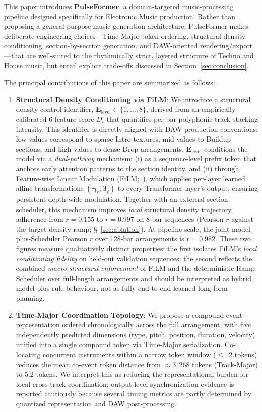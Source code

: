 \documentclass[pdflatex,sn-mathphys-num,twocolumn]{sn-jnl}
\theoremstyle{thmstyleone}
\theoremstyle{thmstyletwo}
\begin{document}
This paper introduces \textbf{PulseFormer}, a domain-targeted music-processing pipeline designed specifically for Electronic Music production. Rather than proposing a general-purpose music generation architecture, PulseFormer makes deliberate engineering choices---Time-Major token ordering, structural-density conditioning, section-by-section generation, and DAW-oriented rendering/export---that are well-suited to the rhythmically strict, layered structure of Techno and House music, but entail explicit trade-offs discussed in Section~\ref{sec:conclusion}. 

The principal contributions of this paper are summarized as follows:
\begin{enumerate}
    \item \textbf{Structural Density Conditioning via FiLM}: We introduce a structural density control identifier, $\mathbf{E}_{\mathrm{level}} \in \{1,\ldots,8\}$, derived from an empirically calibrated 6-feature score $D_t$ that quantifies per-bar polyphonic track-stacking intensity. This identifier is directly aligned with DAW production conventions: low values correspond to sparse Intro textures, mid values to Buildup sections, and high values to dense Drop arrangements. $\mathbf{E}_{\mathrm{level}}$ conditions the model via a \emph{dual-pathway} mechanism: (i) as a sequence-level prefix token that anchors early attention patterns to the section identity, and (ii) through Feature-wise Linear Modulation (FiLM;~\cite{perez2018film}), which applies per-layer learned affine transformations $(\boldsymbol{\gamma}_\ell, \boldsymbol{\beta}_\ell)$ to every Transformer layer's output, ensuring persistent depth-wide modulation. Together with an external section scheduler, this mechanism improves \emph{local} structural density trajectory adherence from $r=0.155$ to $r=0.997$ on 8-bar sequences (Pearson $r$ against the target density ramp; \S~\ref{sec:ablation}). At pipeline scale, the joint model-plus-Scheduler Pearson $r$ over 128-bar arrangements is $r=0.982$. These two figures measure qualitatively distinct properties: the first isolates FiLM's \emph{local conditioning fidelity} on held-out validation sequences; the second reflects the combined \emph{macro-structural enforcement} of FiLM and the deterministic Ramp Scheduler over full-length arrangements and should be interpreted as hybrid model-plus-rule behaviour, not as fully end-to-end learned long-form planning.
    \item \textbf{Time-Major Coordination Topology}: We propose a compound event representation ordered chronologically across the full arrangement, with five independently predicted dimensions (type, pitch, position, duration, velocity) unified into a single compound token via Time-Major serialization. Co-locating concurrent instruments within a narrow token window ($\leq\!12$ tokens) reduces the mean co-event token distance from $\approx\!3{,}268$ tokens (Track-Major) to $5.2$ tokens. We interpret this as reducing the representational burden for local cross-track coordination; output-level synchronization evidence is reported cautiously because several timing metrics are partly determined by quantized representation and DAW post-processing.

\end{enumerate}
\end{document}

